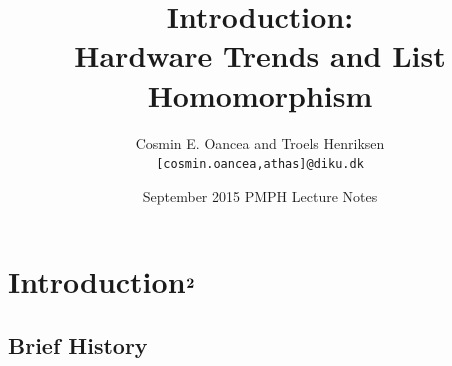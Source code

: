 \documentclass{beamer}
\title[Intro]{Introduction:\\Hardware Trends and List Homomorphism}
\author[C.~Oancea]{Cosmin E. Oancea and Troels Henriksen\\{\tt [cosmin.oancea,athas]@diku.dk}}
\institute{Department of Computer Science (DIKU)\\University of Copenhagen}
\date[Sept 2015]{September 2015 PMPH Lecture Notes}
\begin{document}
\titleslide


\begin{frame}[fragile]
	\tableofcontents
\end{frame}



\section{Introduction$^{\mbox{\bf 2}}$}

\subsection{Brief History}
\end{document}
